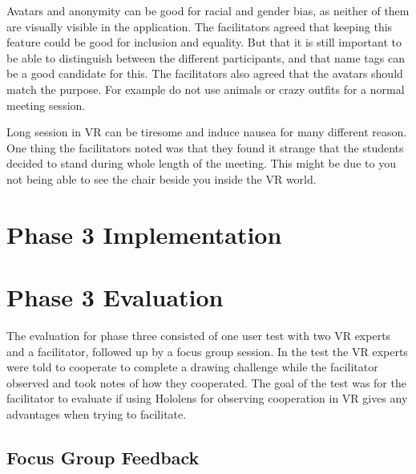         Avatars and anonymity can be good for racial and gender bias, as neither of them are visually visible in the application. The facilitators agreed that keeping this feature could be good for inclusion and equality. But that it is still important to be able to distinguish between the different participants, and that name tags can be a good candidate for this. The facilitators also agreed that the avatars should match the purpose. For example do not use animals or crazy outfits for a normal meeting session.
        
        Long session in VR can be tiresome and induce nausea for many different reason. One thing the facilitators noted was that they found it strange that the students decided to stand during whole length of the meeting. This might be due to you not being able to see the chair beside you inside the VR world.
    
    \section{Phase 3 Implementation} %
    
    \section{Phase 3 Evaluation}
    The evaluation for phase three consisted of one user test with two VR experts and a facilitator, followed up by a focus group session. In the test the VR experts were told to cooperate to complete a drawing challenge while the facilitator observed and took notes of how they cooperated. The goal of the test was for the facilitator to evaluate if using Hololens for observing cooperation in VR gives any advantages when trying to facilitate.
        
        \subsection{Focus Group Feedback}
        
        
        
        
        
        
        